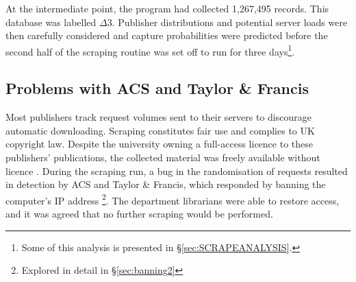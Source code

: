 At the intermediate point, the program had collected 1,267,495 records. This database was labelled $\Delta3$. Publisher distributions and potential server loads were then carefully considered and capture probabilities were predicted before the second half of the scraping routine was set off to run for three days\footnote{Some of this analysis is presented in \S\ref{sec:SCRAPEANALYSIS}.}.
\label{sec:CROSSREFSCRAPE}
\subsection{Problems with ACS and Taylor \& Francis}
\label{sec:banning1}
Most publishers track request volumes sent to their servers to discourage automatic downloading. Scraping constitutes fair use and complies to UK copyright law. Despite the university owning a full-access licence to these publishers' publications, the collected material was freely available without licence\cite{thelaw} \cite{contentminelegal}. During the scraping run, a bug in the randomisation of requests resulted in detection by ACS and Taylor \& Francis, which responded by banning the computer's IP address \footnote{Explored in detail in \S\ref{sec:banning2}}. The department librarians were able to restore access, and it was agreed that no further scraping would be performed.
